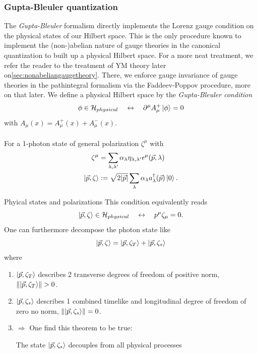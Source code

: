 \subsubsection{Gupta-Bleuler quantization}
The \emph{Gupta-Bleuler} formalism directly implements the Lorenz gauge condition on the physical states of our Hilbert space. This is the only procedure known to implement the (non-)abelian nature of gauge theories in the canonical quantization to built up a physical Hilbert space. For a more neat treatment, we refer the reader to the treatment of YM theory later on\ref{sec:nonabeliangaugetheory}. There, we enforce gauge invariance of gauge theories in the pathintegral formalism via the Faddeev-Poppov procedure, more on that later. We define a physical Hilbert space by the \emph{Gupta-Bleuler condition}
\begin{equation}
	\phi \in \mathcal{H}_{physical} \quad \leftrightarrow \quad \partial^{\mu} A^+_{\mu} \ket{\phi} = 0
\end{equation}
with $A_{\mu}(x) = A^+_{\mu}(x) +A^-_{\mu}(x)$.\\
\\
For a 1-photon state of general polarization $\zeta^{\mu}$ with
\begin{align}
	\zeta^{\mu} &= \sum_{\lambda,\lambda'} \alpha_{\lambda} \eta_{\lambda, \lambda'} \epsilon^{\mu}(\vec{p},\lambda) \\
	\ket{\vec{p},\zeta} &:= \sqrt{2 |\vec{p}|} \sum_{\lambda} \alpha_{\lambda} a^{\dagger}_{\lambda} (\vec{p}) \ket{0}.
\end{align}
\begin{mybox}{Phyical states and polarizations}
This condition equivalently reads
\begin{equation}
	\ket{\vec{p},\zeta} \in \mathcal{H}_{physical} \quad \leftrightarrow\quad p^{\mu} \zeta_{\mu} = 0.
\end{equation}
One can furthermore decompose the photon state like
\begin{equation}
	\ket{\vec{p},\zeta} = \ket{\vec{p},\zeta_T} + \ket{\vec{p},\zeta_s}
\end{equation}
where 
\begin{enumerate}
	\item $\ket{\vec{p},\zeta_T}$ describes 2 transverse degrees of freedom of positive norm, $\norm{\ket{\vec{p},\zeta_T}} >0$.
	\item $\ket{\vec{p},\zeta_s}$ describes 1 combined timelike and longitudinal degree of freedom of zero no norm, $\norm{\ket{\vec{p},\zeta_s}} =0$.
	\item $\Rightarrow$ One find this theorem to be true:
	\begin{statements}
		The state $\ket{\vec{p},\zeta_s}$ decouples from all physical processes
	\end{statements}
\end{enumerate}
\end{mybox}
